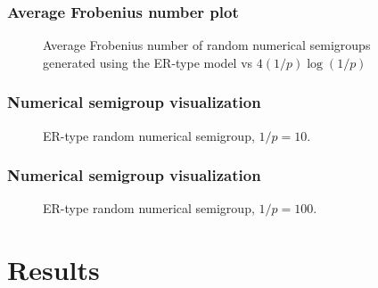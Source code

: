 \documentclass{beamer}
\begin{document}
    \begin{frame}
        \frametitle{Average Frobenius number plot}
        \begin{figure}
            \begin{center}
                \scalebox{0.6}{}
            \end{center}
            \caption{Average Frobenius number of random numerical semigroups generated using the ER-type model vs $4(1/p)\log(1/p)$}
            \label{fig:frobenius}
        \end{figure}
    \end{frame}
    
    \begin{frame}
        \frametitle{Numerical semigroup visualization}
        \begin{figure}
            \begin{center}
                \scalebox{0.8}{}
            \end{center}
            \caption{ER-type random numerical semigroup, $1/p = 10$.}
        \end{figure}
    
    \end{frame}

    \begin{frame}
        \frametitle{Numerical semigroup visualization}
        \begin{figure}
            \begin{center}
                \scalebox{0.8}{}
            \end{center}
            \caption{ER-type random numerical semigroup, $1/p = 100$.}
        \end{figure}
    
    \end{frame}

\section{Results}
\end{document}
